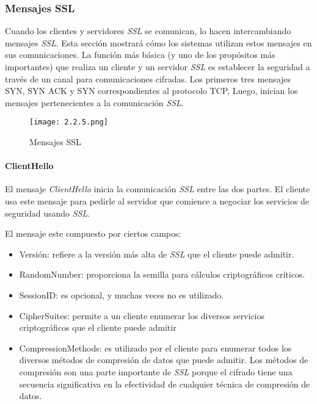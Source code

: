 \subsubsection*{Mensajes SSL}
Cuando los clientes y servidores \emph{SSL} se comunican, lo hacen 
intercambiando mensajes \emph{SSL}. Esta sección mostrará cómo los 
sistemas utilizan estos mensajes en sus comunicaciones. La función 
más básica (y uno de los propósitos más importantes) que realiza 
un cliente y un servidor \emph{SSL} es establecer la seguridad a través
de un canal para comunicaciones cifradas. Los primeros tres mensajes
SYN, SYN ACK y SYN correspondientes al protocolo TCP, Luego, inician los 
mensajes pertenecientes a la comunicación \emph{SSL}.


\begin{center}
   \begin{figure}   
      \begin{center}
         \texttt{[image: 2.2.5.png]}
      \end{center}
      \caption{Mensajes SSL}
   \end{figure}
\end{center}


\paragraph*{ClientHello}
El mensaje \emph{ClientHello} inicia la comunicación \emph{SSL} entre las dos partes. 
El cliente usa este mensaje para pedirle al servidor que comience a 
negociar los servicios de seguridad usando \emph{SSL}.

El mensaje este compuesto por ciertos campos: 
\begin{itemize}
   \setlength\itemsep{-0.6em}
   \item Versión: refiere a la versión más alta de \emph{SSL} que el cliente 
   puede admitir. 
   \item RandomNumber: proporciona la semilla para cálculos criptográficos
   críticos. 
   \item SessionID: es opcional, y muchas veces no es utilizado. 
   \item CipherSuites: permite a un cliente enumerar los diversos 
   servicios criptográficos que el cliente puede admitir
   \item CompressionMethods: es utilizado por el cliente para enumerar 
   todos los diversos métodos de compresión de datos que puede admitir.
    Los métodos de compresión son una parte importante de \emph{SSL} porque el 
    cifrado tiene una secuencia significativa en la efectividad de 
    cualquier técnica de compresión de datos. 
\end{itemize}


